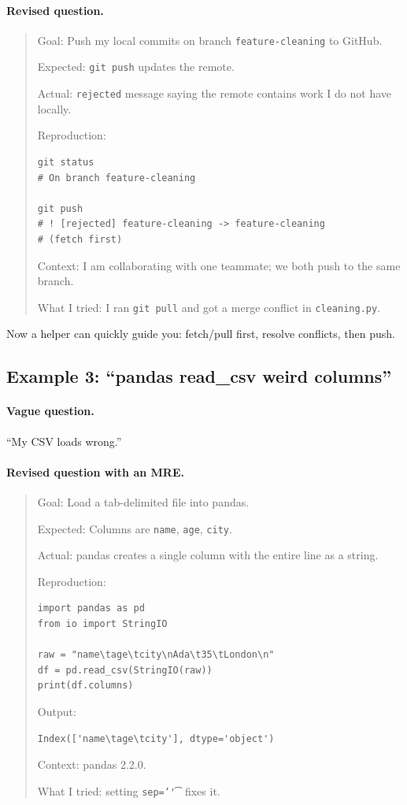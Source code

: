 \paragraph{Revised question.}
\begin{quote}
Goal: Push my local commits on branch \texttt{feature-cleaning} to GitHub.

Expected: \texttt{git push} updates the remote.

Actual: \texttt{rejected} message saying the remote contains work I do not have locally.

Reproduction:
\begin{verbatim}
git status
# On branch feature-cleaning

git push
# ! [rejected] feature-cleaning -> feature-cleaning
# (fetch first)
\end{verbatim}

Context: I am collaborating with one teammate; we both push to the same branch.

What I tried: I ran \texttt{git pull} and got a merge conflict in \texttt{cleaning.py}.
\end{quote}

Now a helper can quickly guide you: fetch/pull first, resolve conflicts, then push.

\subsection{Example 3: ``pandas read\_csv weird columns''}
\paragraph{Vague question.} ``My CSV loads wrong.''

\paragraph{Revised question with an MRE.}
\begin{quote}
Goal: Load a tab-delimited file into pandas.

Expected: Columns are \texttt{name}, \texttt{age}, \texttt{city}.

Actual: pandas creates a single column with the entire line as a string.

Reproduction:
\begin{verbatim}
import pandas as pd
from io import StringIO

raw = "name\tage\tcity\nAda\t35\tLondon\n"
df = pd.read_csv(StringIO(raw))
print(df.columns)
\end{verbatim}

Output:
\begin{verbatim}
Index(['name\tage\tcity'], dtype='object')
\end{verbatim}

Context: pandas 2.2.0.

What I tried: setting \texttt{sep='\t'} fixes it.
\end{quote}

